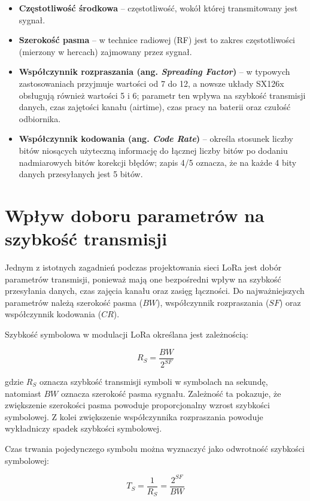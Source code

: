 \documentclass[12pt,a4paper,twoside]{report}
\theoremstyle{definition} %
\begin{document}
\begin{itemize}
    \item \textbf{Częstotliwość środkowa} – częstotliwość, wokół której transmitowany jest sygnał.
    \item \textbf{Szerokość pasma} – w technice radiowej (RF) jest to zakres częstotliwości (mierzony w hercach) zajmowany przez sygnał.
    \item \textbf{Współczynnik rozpraszania (ang. \textit{Spreading Factor})} – w typowych zastosowaniach przyjmuje wartości od 7 do 12, a nowsze układy SX126x obsługują również wartości 5 i 6; parametr ten wpływa na szybkość transmisji danych, czas zajętości kanału (airtime), czas pracy na baterii oraz czułość odbiornika.
    \item \textbf{Współczynnik kodowania (ang. \textit{Code Rate})} – określa stosunek liczby bitów niosących użyteczną informację do łącznej liczby bitów po dodaniu nadmiarowych bitów korekcji błędów; zapis 4/5 oznacza, że na każde 4 bity danych przesyłanych jest 5 bitów.
\end{itemize}

\section{Wpływ doboru parametrów na szybkość transmisji}

Jednym z istotnych zagadnień podczas projektowania sieci LoRa jest dobór parametrów transmisji, ponieważ mają one bezpośredni wpływ na szybkość przesyłania danych, czas zajęcia kanału oraz zasięg łączności. Do najważniejszych parametrów należą szerokość pasma (\(BW\)), współczynnik rozpraszania (\(SF\)) oraz współczynnik kodowania (\(CR\)).

Szybkość symbolowa w modulacji LoRa określana jest zależnością:

	\begin{equation}\label{R_S}
        R_S = \frac{BW}{2^{SF}}
    \end{equation}

gdzie \(R_S\) oznacza szybkość transmisji symboli w symbolach na sekundę, natomiast \(BW\) oznacza szerokość pasma sygnału. Zależność ta pokazuje, że zwiększenie szerokości pasma powoduje proporcjonalny wzrost szybkości symbolowej. Z kolei zwiększenie współczynnika rozpraszania powoduje wykładniczy spadek szybkości symbolowej.

Czas trwania pojedynczego symbolu można wyznaczyć jako odwrotność szybkości symbolowej:

	\begin{equation}\label{T_S}
        T_S = \frac{1}{R_S} = \frac{2^{SF}}{BW}
    \end{equation}
\end{document}
